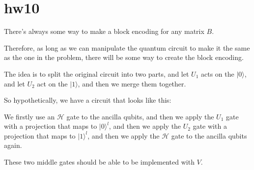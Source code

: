 \documentclass{article}%
\newcommand{\kt}[1]{|#1\rangle}
\begin{document}
\section*{hw10}

There's always some way to make a block encoding for any matrix $B$.

Therefore, as long as we can manipulate the quantum circuit to make it 
the same as the one in the problem, there will be some way to create the block encoding.

The idea is to split the original circuit into two parts,
and let $U_1$ acts on the $\kt{0}$, and let $U_2$ act on the $\kt{1}$,
and then we merge them together.

So hypothetically, we have a circuit that looks like this:

We firstly use an $\mathcal{H}$ gate to the ancilla qubits,
and then we apply the $U_1$ gate with a projection that maps to $\kt{0}^l$,
and then we apply the $U_2$ gate with a projection that maps to $\kt{1}^l$,
and then we apply the $\mathcal{H}$ gate to the ancilla qubits again.

These two middle gates should be able to be implemented with $V$.
\end{document}
